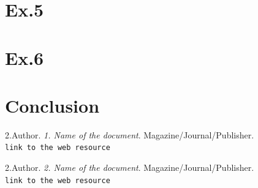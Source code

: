   \chapter{Ex.5}
  \chapter{Ex.6}
\chapter{Conclusion}
  

\begin{thebibliography}{}

{2.Author}. \textit{1. Name of the document}. {Magazine/Journal/Publisher}.\\
\texttt{link to the web resource}

{2.Author}. \textit{2. Name of the document}. {Magazine/Journal/Publisher}.\\
\texttt{link to the web resource}

\end{thebibliography}
